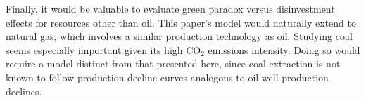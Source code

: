 \documentclass[12pt]{article}
\begin{document}
Finally, it would be valuable to evaluate green paradox versus disinvestment effects for resources other than oil. This paper's model would naturally extend to natural gas, which involves a similar production technology as oil. Studying coal seems especially important given its high CO$_2$ emissions intensity. Doing so would require a model distinct from that presented here, since coal extraction is not known to follow production decline curves analogous to oil well production declines. 





\end{document}
